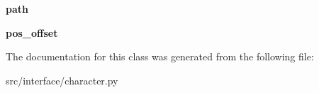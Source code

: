 \begin{DoxyCompactItemize}
\item 
\hypertarget{classinterface_1_1character_1_1_character_a69d9abf3ba521761ccc3c0fd7a225872}{{\bfseries path}}\label{classinterface_1_1character_1_1_character_a69d9abf3ba521761ccc3c0fd7a225872}

\item 
\hypertarget{classinterface_1_1character_1_1_character_abd866821cf85cfa37da9da1697aec484}{{\bfseries pos\-\_\-offset}}\label{classinterface_1_1character_1_1_character_abd866821cf85cfa37da9da1697aec484}

\end{DoxyCompactItemize}


\-The documentation for this class was generated from the following file\-:\begin{DoxyCompactItemize}
\item 
src/interface/character.\-py\end{DoxyCompactItemize}
